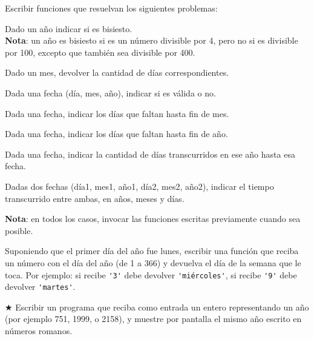 \begin{ejercicio} Escribir funciones que resuelvan los siguientes problemas:
\begin{partes}
    \item Dado un año indicar si es bisiesto. \\
{\bf Nota}: un año es bisiesto si es un número divisible por 4, pero no si es
divisible por 100, excepto que también sea divisible por 400.

    \item Dado un mes, devolver la cantidad de días correspondientes.

    \item Dada una fecha (día, mes, año), indicar si es válida o no.

    \item Dada una fecha, indicar los días que faltan hasta fin de mes.

    \item Dada una fecha, indicar los días que faltan hasta fin de año.

    \item Dada una fecha, indicar la cantidad de días transcurridos en ese año
hasta esa fecha.

    \item Dadas dos fechas (día1, mes1, año1, día2, mes2, año2), indicar el
tiempo transcurrido entre ambas, en años, meses y días.
\end{partes}
{\bf Nota}: en todos los casos, invocar las funciones escritas previamente
cuando sea posible.
\end{ejercicio}


\begin{ejercicio}
Suponiendo que el primer día del año fue lunes, escribir una función
que reciba un número con el día del año (de 1 a 366) y devuelva el día
de la semana que le toca. Por ejemplo: si recibe \verb|'3'| debe devolver
\verb|'miércoles'|, si recibe \verb|'9'| debe devolver \verb|'martes'|.
\end{ejercicio}


\begin{ejercicio}
$\bigstar$ Escribir un programa que reciba como entrada un entero representando un año
(por ejemplo 751, 1999, o 2158), y muestre por pantalla el mismo año escrito en
números romanos.
\end{ejercicio}


